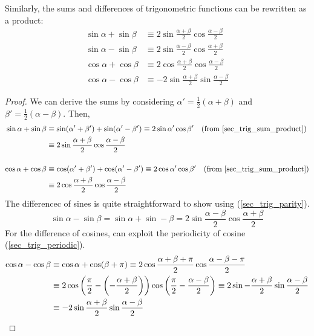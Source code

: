 \begin{theorem}
Similarly, the sums and differences of trigonometric functions can be rewritten
as a product:
\begin{align*}
\sin \alpha + \sin \beta &\equiv
    2 \sin \frac{\alpha + \beta}2 \cos \frac{\alpha - \beta}2 \\
\sin \alpha - \sin \beta &\equiv
    2 \sin \frac{\alpha - \beta} 2 \cos\frac{\alpha + \beta} 2 \\
\cos \alpha + \cos \beta &\equiv
    2 \cos\frac{\alpha + \beta} 2 \cos \frac{\alpha - \beta} 2 \\
\cos \alpha - \cos \beta &\equiv
 -2 \sin \frac{\alpha + \beta} 2 \sin \frac{\alpha - \beta} 2
\end{align*}
\end{theorem}
\begin{proof}
We can derive the sums by considering \(\alpha' = \frac 12 (\alpha + \beta)\)
and \(\beta' = \frac 12 (\alpha - \beta)\). Then,
\begin{align*}
\sin \alpha + \sin \beta &\equiv
 \sin(\alpha' + \beta') + \sin(\alpha' - \beta') \equiv
 2\sin \alpha' \cos \beta'\quad \text{(from \ref{sec_trig_sum_product})}
\\&\equiv 2 \sin \frac{\alpha + \beta}2 \cos \frac{\alpha - \beta} 2 \\[3ex]
 \cos \alpha + \cos \beta &\equiv
 \cos(\alpha' + \beta') + \cos(\alpha' - \beta') \equiv
 2\cos \alpha' \cos \beta'\quad \text{(from \ref{sec_trig_sum_product})}
 \\&\equiv 2 \cos\frac{\alpha + \beta} 2 \cos \frac{\alpha - \beta} 2
\end{align*}
The differencec of sines is quite straightforward to show using
(\ref{sec_trig_parity}).
\begin{equation*}
\sin \alpha - \sin \beta =
    \sin \alpha + \sin -\beta =
    2 \sin \frac{\alpha - \beta} 2 \cos\frac{\alpha + \beta} 2
\end{equation*}
For the difference of cosines, can exploit the periodicity of cosine
(\ref{sec_trig_periodic}).
\begin{align*}
 \cos \alpha - \cos \beta &\equiv
 \cos \alpha + \cos (\beta + \pi)  \equiv
 2 \cos \frac{\alpha + \beta + \pi} 2 \cos \frac {\alpha - \beta - \pi} 2
 \\&\equiv
 2 \cos \pqty{\frac \pi 2 - \pqty{-\frac{\alpha + \beta} 2}}
   \cos \pqty{\frac \pi 2 - \frac{\alpha - \beta} 2} \equiv
 2 \sin -\frac{\alpha + \beta} 2 \sin \frac{\alpha - \beta} 2 \\&\equiv
 -2 \sin \frac{\alpha + \beta} 2 \sin \frac{\alpha - \beta} 2 \qedhere
\end{align*}
\end{proof}

